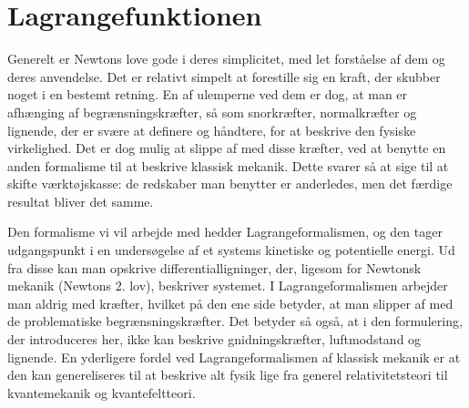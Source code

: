 \section{Lagrangefunktionen}
Generelt er Newtons love gode i deres simplicitet, med let forståelse af dem og deres anvendelse. Det er relativt simpelt at forestille sig en kraft, der skubber noget i en bestemt retning. En af ulemperne ved dem er dog, at man er afhænging af begrænsningskræfter, så som snorkræfter, normalkræfter og lignende, der er svære at definere og håndtere, for at beskrive den fysiske virkelighed. Det er dog mulig at slippe af med disse kræfter, ved at benytte en anden formalisme til at beskrive klassisk mekanik. Dette svarer så at sige til at skifte værktøjskasse: de redskaber man benytter er anderledes, men det færdige resultat bliver det samme.

Den formalisme vi vil arbejde med hedder Lagrangeformalismen, og den tager udgangspunkt i en undersøgelse af et systems kinetiske og potentielle energi. Ud fra disse kan man opskrive differentialligninger, der, ligesom for Newtonsk mekanik (Newtons 2. lov), beskriver systemet. I Lagrangeformalismen arbejder man aldrig med kræfter, hvilket på den ene side betyder, at man slipper af med de problematiske begrænsningskræfter. Det betyder så også, at i den formulering, der introduceres her, ikke kan beskrive gnidningskræfter, luftmodstand og lignende. En yderligere fordel ved Lagrangeformalismen af klassisk mekanik er at den kan genereliseres til at beskrive alt fysik lige fra generel relativitetsteori til kvantemekanik og kvantefeltteori.

